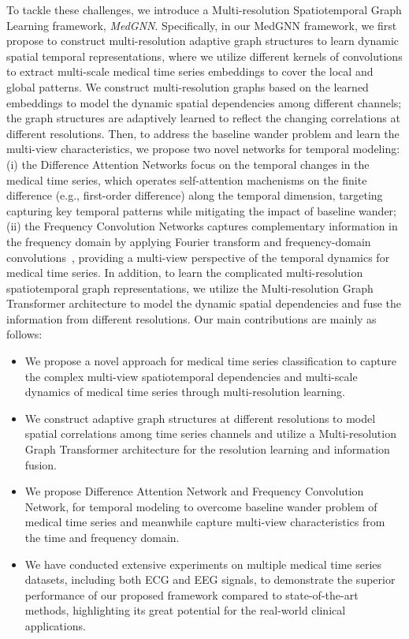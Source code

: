 To tackle these challenges, we introduce a Multi-resolution Spatiotemporal Graph Learning framework, \textit{{MedGNN}}.
Specifically, in our MedGNN framework, we first propose to construct multi-resolution adaptive graph structures to learn dynamic spatial temporal representations, where we utilize different kernels of convolutions to extract multi-scale medical time series embeddings to cover the local and global patterns. We construct multi-resolution graphs based on the learned embeddings to model the dynamic spatial dependencies among different channels; the graph structures are adaptively learned to reflect the changing correlations at different resolutions. 
Then, to address the baseline wander problem and learn the multi-view characteristics, we propose two novel networks for temporal modeling: (i) the Difference Attention Networks focus on the temporal changes in the medical time series, which operates self-attention machenisms on the finite difference (e.g., first-order difference) along the temporal dimension, targeting capturing key temporal patterns while mitigating the impact of baseline wander; (ii) the Frequency Convolution Networks captures complementary information in the frequency domain by applying Fourier transform and frequency-domain convolutions~\cite{yi2024frequency, yi2024filternet}, providing a multi-view perspective of the temporal dynamics for medical time series.
In addition, to learn the complicated multi-resolution spatiotemporal graph representations, we utilize the Multi-resolution Graph Transformer architecture to model the dynamic spatial dependencies and fuse the information from different resolutions. Our main contributions are mainly as follows:
\vspace{-0mm}
\begin{itemize}[leftmargin=*]
    \item We propose a novel approach for medical time series classification to capture the complex multi-view spatiotemporal dependencies and multi-scale dynamics of medical time series through multi-resolution learning.
    \item We construct adaptive graph structures at different resolutions to model spatial correlations among time series channels and utilize a Multi-resolution Graph Transformer architecture for the resolution learning and information fusion.
    \item We propose Difference Attention Network and Frequency Convolution Network, for temporal modeling to overcome baseline wander problem of medical time series and meanwhile capture multi-view characteristics from the time and frequency domain.
    \item We have conducted extensive experiments on multiple medical time series datasets, including both ECG and EEG signals, to demonstrate the superior performance of our proposed framework compared to state-of-the-art methods, highlighting its great potential for the real-world clinical applications.
\end{itemize}

